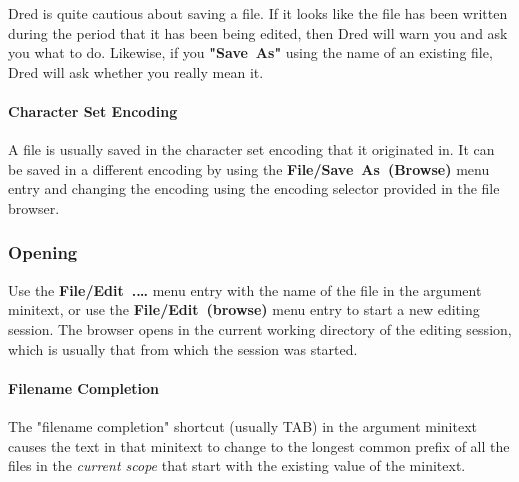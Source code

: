 \documentclass[
]{article}
\begin{document}
Dred is quite cautious about saving a file. If it looks like the file
has been written during the period that it has been being edited, then
Dred will warn you and ask you what to do. Likewise, if you
\textbf{"Save~As"} using the name of an existing file, Dred will ask
whether you really mean it.

\hypertarget{character-set-encoding}{%
\paragraph{Character Set Encoding}\label{character-set-encoding}}

A file is usually saved in the character set encoding that it originated
in. It can be saved in a different encoding by using the
\textbf{File/Save~As~(Browse)} menu entry and changing the encoding
using the encoding selector provided in the file browser.

\hypertarget{opening}{%
\subsubsection{Opening}\label{opening}}

Use the \textbf{File/Edit~.\ldots{}} menu entry with the name of the
file in the argument minitext, or use the \textbf{File/Edit~(browse)}
menu entry to start a new editing session. The browser opens in the
current working directory of the editing session, which is usually that
from which the session was started.

\hypertarget{filename-completion}{%
\paragraph{Filename Completion}\label{filename-completion}}

The "filename completion" shortcut (usually TAB) in the argument
minitext causes the text in that minitext to change to the longest
common prefix of all the files in the \emph{current scope} that start
with the existing value of the minitext.
\end{document}
